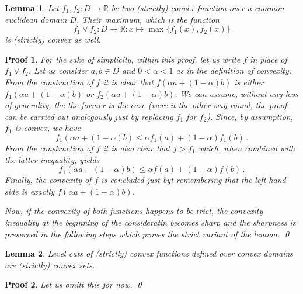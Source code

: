 \documentclass[12pt]{book}
\newtheorem{lemma}{Lemma}
\newtheorem*{pf}{Proof}
\begin{document}
\begin{lemma}
    Let $f_{1},f_{2}\colon D\to\mathbb{R}$ be two (strictly) convex function
        over a common euclidean domain $D$.
    Their maximum, which is the function
        \begin{equation*}
            f_{1}\vee f_{2}
            \colon
            D\to\mathbb{R}
            \colon
            x\mapsto\max\{f_{1}(x),f_{2}(x)\}
        \end{equation*}
        is (strictly) convex as well.
\end{lemma}
\begin{pf}
    For the sake of simplicity, within this proof, let us write $f$ in place
        of $f_{1}\vee f_{2}$.
    Let us consider $a,b\in D$ and $0<\alpha<1$ as in the definition of
        convexity.
    From the construction of $f$ it is clear that $f(\alpha a + (1-\alpha) b)$
        is either $f_{1}(\alpha a + (1-\alpha) b)$ or
        $f_{2}(\alpha a + (1-\alpha) b)$.
    We can assume, without any loss of generality, the the former is the case
        (were it the other way round, the proof can be carried out analogously
        just by replacing $f_{1}$ for $f_{2}$).
    Since, by assumption, $f_{1}$ is convex, we have 
        \begin{equation*}
            f_{1}(\alpha a + (1-\alpha) b)
            \le
            \alpha f_{1}(a) + (1-\alpha) f_{1}(b)\,.
        \end{equation*}
    From the construction of $f$ it is also clear that $f>f_{1}$ which, when
        combined with the latter inequality, yields
        \begin{equation*}
            f_{1}(\alpha a + (1-\alpha) b)
            \le
            \alpha f(a) + (1-\alpha) f(b)\,.
        \end{equation*}
    Finally, the convexity of $f$ is concluded just byt remembering that the
        left hand side is exactly $f(\alpha a + (1-\alpha) b)$.

    Now, if the convexity of both functions happens to be trict, the convexity
        inequality at the beginning of the consideratin becomes sharp and the
        sharpness is preserved in the following steps which proves the strict
        variant of the lemma.
    \qed
\end{pf}

\begin{lemma}
    Level cuts of (strictly) convex functions defined over convex domains are
        (strictly) convex sets.
\end{lemma}
\begin{pf}
    Let us omitt this for now.
    \qed
\end{pf}
\end{document}
